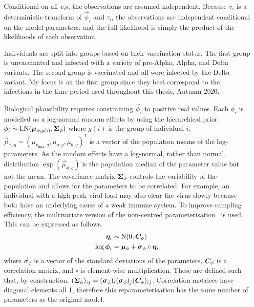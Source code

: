 \documentclass[thesis.tex]{subfiles}
\begin{document}
Conditional on all $v_i$s, the observations are assumed independent.
Because $v_i$ is a deterministic transform of $\vec{\phi}_i$ and $\tau_i$, the observations are independent conditional on the model parameters, and the full likelihood is simply the product of the likelihoods of each observation.

Individuals are split into groups based on their vaccination status.
The first group is unvaccinated and infected with a variety of pre-Alpha, Alpha, and Delta variants.
The second group is vaccinated and all were infected by the Delta variant.
My focus is on the first group since they best correspond to the infections in the time period used throughout this thesis, Autumn 2020.

Biological plausibility requires constraining $\vec{\phi}_i$ to positive real values.
Each $\phi_i$ is modelled as a log-normal random effects by using the hierarchical prior $\phi_i \sim \operatorname{LN}(\bm{\mu}_{\phi,g(i)}, \bm{\Sigma}_\phi)$ where $g(i)$ is the group of individual $i$.
$\vec{\mu}_{\phi,g} = (\mu_{v_{\max},g}, \mu_{a,g}, \mu_{b,g})^T$ is a vector of the population means of the log-parameters.
As the random effects have a log-normal, rather than normal, distribution $\exp(\vec{\mu}_{\phi,g})$ is the population median of the parameter value but not the mean.
The covariance matrix $\bm{\Sigma}_\phi$ controls the variability of the population and allows for the parameters to be correlated.
For example, an individual with a high peak viral load may also clear the virus slowly because both have an underlying cause of a weak immune system.
To improve sampling efficiency, the multivariate version of the non-centred parameterisation~\autocites{papaspiliopoulosGeneral,stanReparameterization} is used.
This can be expressed as follows.
\begin{align}
  \bm{\eta}_i &\sim \operatorname{N}(0, \bm{C}_\phi) \\
  \log \bm{\phi}_i &= \bm{\mu}_\phi + \bm{\sigma}_\phi \circ \bm{\eta}_i
\end{align}
where $\vec{\sigma}_\phi$ is a vector of the standard deviations of the parameters, $\bm{C}_\phi$ is a correlation matrix, and $\circ$ is element-wise multiplication.
These are defined such that, by construction, $(\bm{\Sigma}_\phi)_{ij} = (\bm{\sigma}_\phi)_i (\bm{\sigma}_\phi)_j (\bm{C}_\phi)_{ij}$.
Correlation matrices have diagonal elements all 1, therefore this reparameterisation has the same number of parameters as the original model.
\end{document}
